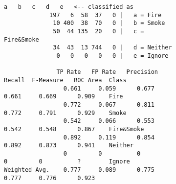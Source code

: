 \begin{figure}[h]
    \begin{subfigure}[b]{\textwidth}
    \caption{}
    \label{fig:cmatrix06}
    \begin{lstlisting}[language={}, basicstyle=\footnotesize, frame=none, basewidth=0.45em]
			   a   b   c   d   e   <-- classified as
			 197   6  58  37   0 |   a = Fire
			  10 400  38  70   0 |   b = Smoke
			  50  44 135  20   0 |   c = Fire&Smoke
			  34  43  13 744   0 |   d = Neither
			   0   0   0   0   0 |   e = Ignore

               TP Rate   FP Rate   Precision   Recall  F-Measure   ROC Area  Class
                 0.661     0.059      0.677     0.661     0.669      0.909    Fire
                 0.772     0.067      0.811     0.772     0.791      0.929    Smoke
                 0.542     0.066      0.553     0.542     0.548      0.867    Fire&Smoke
                 0.892     0.119      0.854     0.892     0.873      0.941    Neither
                 0         0          0         0         0          ?        Ignore
Weighted Avg.    0.777     0.089      0.775     0.777     0.776      0.923
    \end{lstlisting}
    \end{subfigure}


\end{figure}
